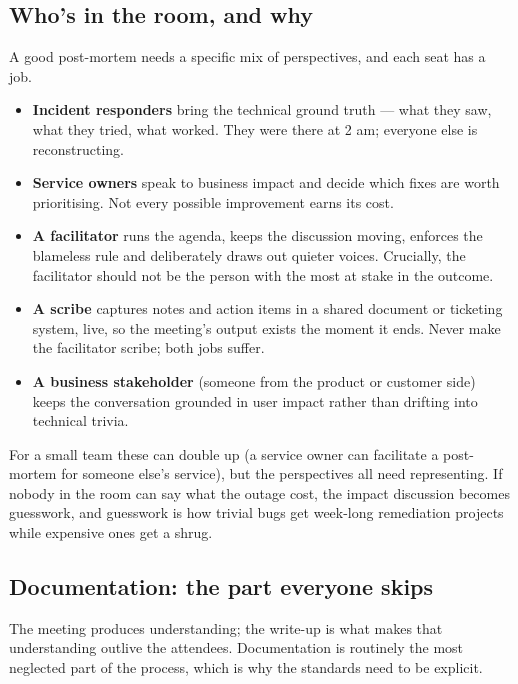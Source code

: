 \subsection{Who's in the room, and why}


A good post-mortem needs a specific mix of perspectives, and each seat has a job.


\begin{itemize}[leftmargin=*]
\item \textbf{Incident responders} bring the technical ground truth — what they saw, what they tried, what worked. They were there at 2 am; everyone else is reconstructing.
\item \textbf{Service owners} speak to business impact and decide which fixes are worth prioritising. Not every possible improvement earns its cost.
\item \textbf{A facilitator} runs the agenda, keeps the discussion moving, enforces the blameless rule and deliberately draws out quieter voices. Crucially, the facilitator should not be the person with the most at stake in the outcome.
\item \textbf{A scribe} captures notes and action items in a shared document or ticketing system, live, so the meeting's output exists the moment it ends. Never make the facilitator scribe; both jobs suffer.
\item \textbf{A business stakeholder} (someone from the product or customer side) keeps the conversation grounded in user impact rather than drifting into technical trivia.
\end{itemize}

For a small team these can double up (a service owner can facilitate a post-mortem for someone else's service), but the perspectives all need representing. If nobody in the room can say what the outage cost, the impact discussion becomes guesswork, and guesswork is how trivial bugs get week-long remediation projects while expensive ones get a shrug.



\subsection{Documentation: the part everyone skips}


The meeting produces understanding; the write-up is what makes that understanding outlive the attendees. Documentation is routinely the most neglected part of the process, which is why the standards need to be explicit.


